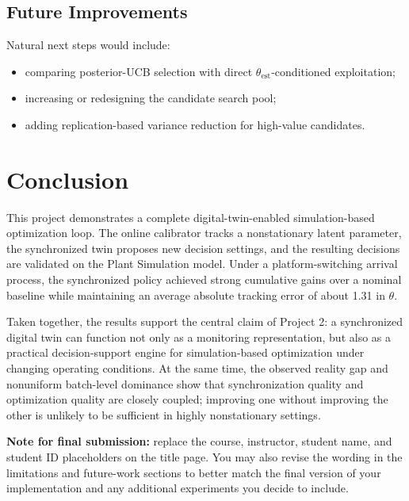 \documentclass[11pt]{article}
\begin{document}
\subsection{Future Improvements}
Natural next steps would include:
\begin{itemize}[leftmargin=1.5em]
    \item comparing posterior-UCB selection with direct $\theta_{\text{est}}$-conditioned exploitation;
    \item increasing or redesigning the candidate search pool;
    \item adding replication-based variance reduction for high-value candidates.
\end{itemize}

\section{Conclusion}
This project demonstrates a complete digital-twin-enabled simulation-based optimization loop. The online calibrator tracks a nonstationary latent parameter, the synchronized twin proposes new decision settings, and the resulting decisions are validated on the Plant Simulation model. Under a platform-switching arrival process, the synchronized policy achieved strong cumulative gains over a nominal baseline while maintaining an average absolute tracking error of about 1.31 in $\theta$.

Taken together, the results support the central claim of Project 2: a synchronized digital twin can function not only as a monitoring representation, but also as a practical decision-support engine for simulation-based optimization under changing operating conditions. At the same time, the observed reality gap and nonuniform batch-level dominance show that synchronization quality and optimization quality are closely coupled; improving one without improving the other is unlikely to be sufficient in highly nonstationary settings.


\vspace{1em}
\noindent\textbf{Note for final submission:} replace the course, instructor, student name, and student ID placeholders on the title page. You may also revise the wording in the limitations and future-work sections to better match the final version of your implementation and any additional experiments you decide to include.
\end{document}
